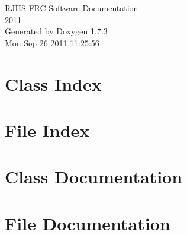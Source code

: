\documentclass[letterpaper]{book}
\begin{document}
\hypersetup{pageanchor=false}
\begin{titlepage}
\vspace*{7cm}
\begin{center}
{\Large RJHS FRC Software Documentation \\[1ex]\large 2011 }\\
\vspace*{1cm}
{\large Generated by Doxygen 1.7.3}\\
\vspace*{0.5cm}
{\small Mon Sep 26 2011 11:25:56}\\
\end{center}
\end{titlepage}
\clearemptydoublepage
{}
\tableofcontents
\clearemptydoublepage
{}
\hypersetup{pageanchor=true}
\chapter{Class Index}

\chapter{File Index}

\chapter{Class Documentation}






\chapter{File Documentation}














\printindex
\end{document}
